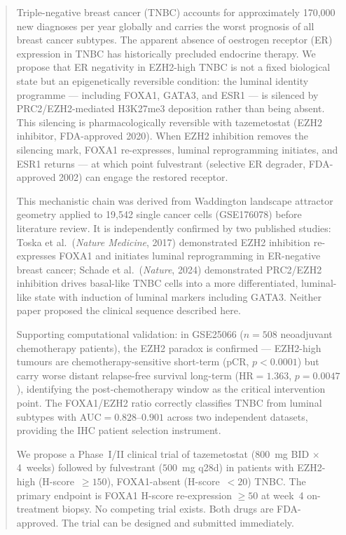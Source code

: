 \documentclass[12pt, a4paper]{article}
\begin{document}
\vspace{0.8em}

\begin{abstract}
\noindent
Triple-negative breast cancer (TNBC) accounts for
approximately 170,000 new diagnoses per year globally
and carries the worst prognosis of all breast cancer
subtypes. The apparent absence of oestrogen receptor
(ER) expression in TNBC has historically precluded
endocrine therapy. We propose that ER negativity in
EZH2-high TNBC is not a fixed biological state but
an epigenetically reversible condition: the luminal
identity programme --- including FOXA1, GATA3, and
ESR1 --- is silenced by PRC2/EZH2-mediated H3K27me3
deposition rather than being absent. This silencing
is pharmacologically reversible with tazemetostat
(EZH2 inhibitor, FDA-approved 2020). When EZH2
inhibition removes the silencing mark, FOXA1
re-expresses, luminal reprogramming initiates, and
ESR1 returns --- at which point fulvestrant
(selective ER degrader, FDA-approved 2002) can engage
the restored receptor.

This mechanistic chain was derived from Waddington
landscape attractor geometry applied to 19,542 single
cancer cells (GSE176078) before literature review.
It is independently confirmed by two published
studies: Toska et al.\ (\textit{Nature Medicine},
2017) demonstrated EZH2 inhibition re-expresses FOXA1
and initiates luminal reprogramming in ER-negative
breast cancer; Schade et al.\ (\textit{Nature}, 2024)
demonstrated PRC2/EZH2 inhibition drives basal-like
TNBC cells into a more differentiated, luminal-like
state with induction of luminal markers including
GATA3. Neither paper proposed the clinical sequence
described here.

Supporting computational validation: in GSE25066
($n=508$ neoadjuvant chemotherapy patients), the
EZH2 paradox is confirmed --- EZH2-high tumours are
chemotherapy-sensitive short-term (pCR, $p<0.0001$)
but carry worse distant relapse-free survival
long-term (HR$=1.363$, $p=0.0047$), identifying the
post-chemotherapy window as the critical intervention
point. The FOXA1/EZH2 ratio correctly classifies TNBC
from luminal subtypes with AUC$=0.828$--$0.901$
across two independent datasets, providing the IHC
patient selection instrument.

We propose a Phase~I/II clinical trial of tazemetostat
($800$~mg BID $\times$ 4~weeks) followed by fulvestrant
($500$~mg q28d) in patients with EZH2-high
(H-score~$\geq150$), FOXA1-absent (H-score~$<20$)
TNBC. The primary endpoint is FOXA1 H-score
re-expression $\geq50$ at week~4 on-treatment biopsy.
No competing trial exists. Both drugs are FDA-approved.
The trial can be designed and submitted immediately.
\end{abstract}
\end{document}
